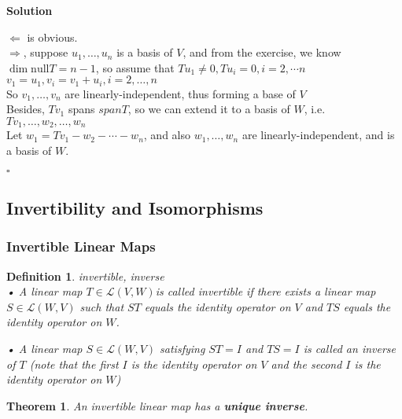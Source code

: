 \documentclass{article}
\newtheorem{theorem}{Theorem}[subsection]
\newtheorem{definition}{Definition}[subsection]
\newenvironment{solution}{%
{
    \textbf{Solution\\}
    }
}{
  \hfill $\square$ 
  \par\bigskip 
}
\begin{document}
\begin{CJK}{UTF8}{gkai}
\begin{solution}
$\Leftarrow$ is obvious.\\

$\Rightarrow$, suppose $u_1,\ldots,u_n$ is a basis of $V$, and from the exercise, we know $\dim \text{null} T = n - 1$, so assume that $Tu_1 \neq 0, Tu_i = 0, i = 2,\cdots n$\\ 

$v_1 = u_1 ,v_i = v_1 + u_i, i = 2,\ldots, n$\\

So $v_1,\ldots, v_n$ are linearly-independent, thus forming a base of $V$\\

Besides, $Tv_1$ spans $span T$, so we can extend it to a basis of $W$, i.e. $Tv_1,\ldots, w_2,\ldots, w_n$\\

Let $w_1 = Tv_1 - w_2 - \cdots - w_n$, and also $w_1,\ldots,w_n$ are linearly-independent, and is a basis of $W$.

\end{solution}

\subsection{Invertibility and Isomorphisms}

\subsubsection{Invertible Linear Maps}

\begin{definition}
    invertible, inverse\\
    
    • A linear map $T \in \mathcal{L}(V,W)$is called invertible if there exists a linear map $S \in\mathcal{L}(W,V) $ such that $ST$ equals the identity operator on $V$ and $TS$ equals the identity operator on $W$.

    • A linear map $S \in \mathcal{L}(W,V)$ satisfying $ST = I$ and $TS = I$ is called an inverse of $T$ (note that the first $I$ is the identity operator on $V$ and the second
    $I$ is the identity operator on $W$)\\
    
\end{definition}

\begin{theorem}
    An invertible linear map has a \textbf{unique inverse}.
\end{theorem}


\end{CJK}
\end{document}
